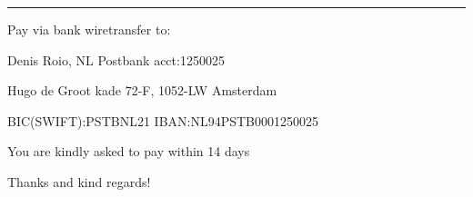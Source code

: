 \vspace{.5cm}\hrule\vspace{.5cm}

Pay  via  bank  wiretransfer  to:

Denis Roio, NL Postbank acct:1250025

Hugo de Groot kade 72-F, 1052-LW Amsterdam

BIC(SWIFT):PSTBNL21 IBAN:NL94PSTB0001250025

You are kindly asked to pay within 14 days

Thanks and kind regards!


